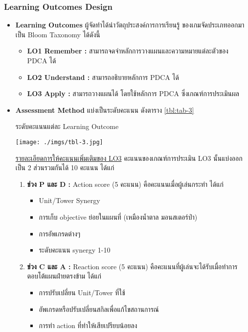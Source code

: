 \documentclass[12pt,oneside,openright,a4paper]{cpe-thai-project}
\begin{document}
\subsubsection{Learning Outcomes Design}
\begin{itemize}
  \item \textbf{Learning Outcomes} ผู้จัดทำได้นำวัตถุประสงค์การการเรียนรู้
  ของเกมจัดประเภทออกมาเป็น Bloom Taxonomy ได้ดังนี้
  \begin{itemize}
    \item \textbf{LO1 Remember :} สามารถจดจำหลักการวางแผนและความหมายแต่ละตัวของ PDCA ได้
    \item \textbf{LO2 Understand :} สามารถอธิบายหลักการ PDCA ได้
    \item \textbf{LO3 Apply :} สามารถวางแผนได้ โดยใช้หลักการ PDCA
    ซึ่งเกณฑ์การประเมินผล
  \end{itemize}

  
  \item \textbf{Assessment Method} แบ่งเป็นระดับคะแนน ดังตาราง \ref{tbl:tab-3}
  \begin{table}[H]
    \caption{ระดับคะแนนแต่ละ Learning Outcome}\label{tbl:tab-3}
    \centering
    \texttt{[image: ./imgs/tbl-3.jpg]}
  \end{table}

  \pagebreak
  \underline{รายละเอียดการให้คะแนนเพิ่มเติมของ LO3} คะแนนของเกณฑ์การประเมิน 
  LO3 นั้นแบ่งออกเป็น 2 ส่วนรวมกันได้ 10 คะแนน ได้แก่
  \begin{enumerate}
    \item \textbf{ช่วง P และ D :} Action score (5 คะแนน) คือคะแนนเมื่อผู้เล่นกระทำ ได้แก่ 
    \begin{itemize}
      \item Unit/Tower Synergy 
      \item การเก็บ objective ย่อยในแผนที่ (เหมืองน้ำตาล มอนสเตอร์ป่า) 
      \item การอัพเกรดต่างๆ
      \item ระดับคะแนน synergy 1-10
    \end{itemize}

    \item \textbf{ช่วง C และ A :} Reaction score (5 คะแนน) 
    คือคะแนนที่ผู้เล่นจะได้รับเมื่อทำการตอบโต้แผนฝ่ายตรงข้าม ได้แก่
    \begin{itemize}
      \item การปรับเปลี่ยน Unit/Tower ที่ใช้
      \item อัพเกรดหรือปรับเปลี่ยนสกิลเพื่อแก้ไขสถานการณ์
      \item การทำ action ที่ทำให้เสียเปรียบน้อยลง
    \end{itemize}
  \end{enumerate}


\end{itemize}
\end{document}
